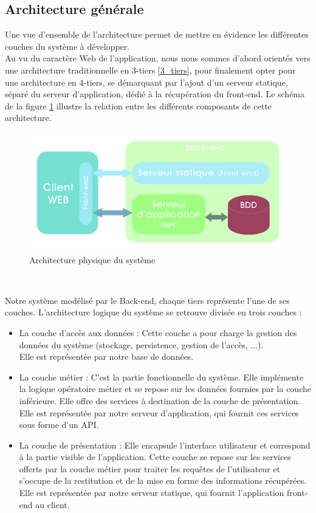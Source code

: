 \begin{spacing}{1.5}
\subsection{Architecture générale}
Une vue d'ensemble de l'architecture permet de mettre en évidence les différentes couches du système à développer.\\
Au vu du caractère Web de l'application, nous nous sommes d'abord orientés vers une architecture traditionnelle en 3-tiers \ref{3_tiers}, pour finalement opter pour une architecture en 4-tiers, se démarquant par l'ajout d'un serveur statique, séparé du serveur d'application, dédié à la récupération du front-end. Le schéma de la figure \ref{fig:baseArchitecture} illustre la relation entre les différents composants de cette architecture.

\begin{figure}[h]
\centering
\includegraphics[width=1\linewidth]{baseArchitecture.jpg}
\caption{Architecture physique du système}
\label{fig:baseArchitecture}
\end{figure}
\

Notre système modélisé par le Back-end, chaque tiers représente l'une de ses couches. L'architecture logique du système se retrouve divisée en trois couches :
\begin{itemize}
    \item La couche d'accès aux données : Cette couche a pour charge la gestion des données du système (stockage, persistence, gestion de l'accès, ...).\\
Elle est représentée par notre base de données.
    \item La couche métier : C'est la partie fonctionnelle du système. Elle implémente la logique opératoire métier et se repose sur les données fournies par la couche inférieure. Elle offre des services à destination de la couche de présentation.\\
Elle est représentée par notre serveur d'application, qui fournit ces services sous forme d'un API.
    \item La couche de présentation : Elle encapsule l'interface utilisateur et correspond à la partie visible de l'application. Cette couche se repose sur les services offerts par la couche métier pour traiter les requêtes de l'utilisateur et s'occupe de la restitution et de la mise en forme des informations récupérées.\\
Elle est représentée par notre serveur statique, qui fournit l'application front-end au client.
\end{itemize}
\


\end{spacing}
